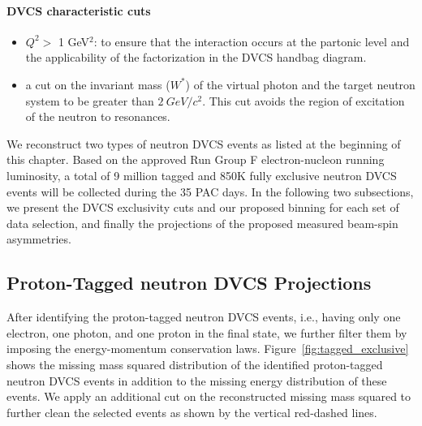 \paragraph{DVCS characteristic cuts}
\begin{itemize}
 \item $Q^{2}>$ 1 GeV$^{2}$: to ensure that the interaction occurs at the 
    partonic level and the applicability of the factorization in the DVCS  
      handbag diagram.

 \item a cut on the invariant mass ($W^*$) of the virtual photon and the target 
    neutron system to be greater than $2~GeV/c{^2}$. This cut avoids the region 
      of excitation of the neutron to resonances.
\end{itemize}

We reconstruct two types of neutron DVCS events as listed at the beginning of 
this chapter. Based on the approved  Run Group F electron-nucleon running 
luminosity, a total of 9 million tagged and 850K fully exclusive neutron DVCS 
events will be collected during the 35 PAC days. In the following two 
subsections, we present the DVCS exclusivity cuts and our proposed binning for 
each set of data selection, and finally the projections of the proposed 
measured beam-spin asymmetries.  



\subsection{Proton-Tagged neutron DVCS Projections}
After identifying the proton-tagged neutron DVCS events, i.e., having only one 
electron, one photon, and one proton in the final state, we further filter them 
by imposing the energy-momentum conservation laws.  
Figure~\ref{fig:tagged_exclusive} shows the missing mass squared distribution 
of the identified proton-tagged neutron DVCS events in addition to the missing 
energy distribution of these events. We apply an additional cut on the 
reconstructed missing mass squared to further clean the selected events as 
shown by the vertical red-dashed lines. 

